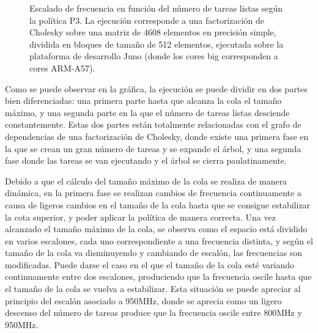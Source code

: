\begin{figure}
  \centering
  {
    \setlength{\fboxsep}{-10pt}
  }
  \caption[Escalado de frecuencia en función del número de tareas listas
  según la política P3]{Escalado de frecuencia en función del número de
    tareas listas según la política P3. La ejecución corresponde a una
    factorización de Cholesky sobre una matriz de 4608 elementos en
    precisión simple, dividida en bloques de tamaño de 512 elementos,
    ejecutada sobre la plataforma de desarrollo Juno (donde los cores big
    corresponden a cores ARM-A57).}
  \label{s5:fig:P3-evo}
\end{figure}


Como se puede observar en la gráfica, la ejecución se puede dividir en dos
partes bien diferenciadas: una primera parte hasta que alcanza la cola el
tamaño máximo, y una segunda parte en la que el número de tareas listas
desciende constantemente. Estas dos partes están totalmente relacionadas
con el grafo de dependencias de una factorización de Cholesky, donde existe
una primera fase en la que se crean un gran número de tareas y se expande
el árbol, y una segunda fase donde las tareas se van ejecutando y el árbol
se cierra paulatinamente.

Debido a que el cálculo del tamaño máximo de la cola se realiza de manera
dinámica, en la primera fase se realizan cambios de frecuencia
continuamente a causa de ligeros cambios en el tamaño de la cola hasta que
se consigue estabilizar la cota superior, y poder aplicar la política de
manera correcta. Una vez alcanzado el tamaño máximo de la cola, se observa
como el espacio está dividido en varios escalones, cada uno correspondiente
a una frecuencia distinta, y según el tamaño de la cola va disminuyendo y
cambiando de escalón, las frecuencias son modificadas. Puede darse el caso
en el que el tamaño de la cola esté variando continuamente entre dos
escalones, produciendo que la frecuencia oscile hasta que el tamaño de la
cola se vuelva a estabilizar. Esta situación se puede apreciar al principio
del escalón asociado a 950MHz, donde se aprecia como un ligero descenso del
número de tareas produce que la frecuencia oscile entre 800MHz y 950MHz.


